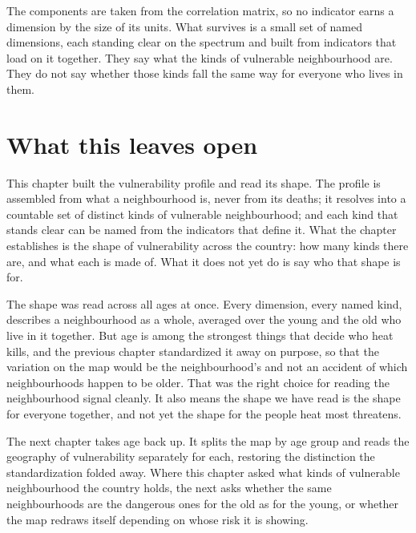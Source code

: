 The components are taken from the correlation matrix, so no indicator earns a dimension by the size of its units. What survives is a small set of named dimensions, each standing clear on the spectrum and built from indicators that load on it together. They say what the kinds of vulnerable neighbourhood are. They do not say whether those kinds fall the same way for everyone who lives in them.

\section{What this leaves open}

This chapter built the vulnerability profile and read its shape. The profile is assembled from what a neighbourhood is, never from its deaths; it resolves into a countable set of distinct kinds of vulnerable neighbourhood; and each kind that stands clear can be named from the indicators that define it. What the chapter establishes is the shape of vulnerability across the country: how many kinds there are, and what each is made of. What it does not yet do is say who that shape is for.

The shape was read across all ages at once. Every dimension, every named kind, describes a neighbourhood as a whole, averaged over the young and the old who live in it together. But age is among the strongest things that decide who heat kills,%
and the previous chapter standardized it away on purpose, so that the variation on the map would be the neighbourhood's and not an accident of which neighbourhoods happen to be older. That was the right choice for reading the neighbourhood signal cleanly. It also means the shape we have read is the shape for everyone together, and not yet the shape for the people heat most threatens.

The next chapter takes age back up. It splits the map by age group and reads the geography of vulnerability separately for each, restoring the distinction the standardization folded away. Where this chapter asked what kinds of vulnerable neighbourhood the country holds, the next asks whether the same neighbourhoods are the dangerous ones for the old as for the young, or whether the map redraws itself depending on whose risk it is showing.